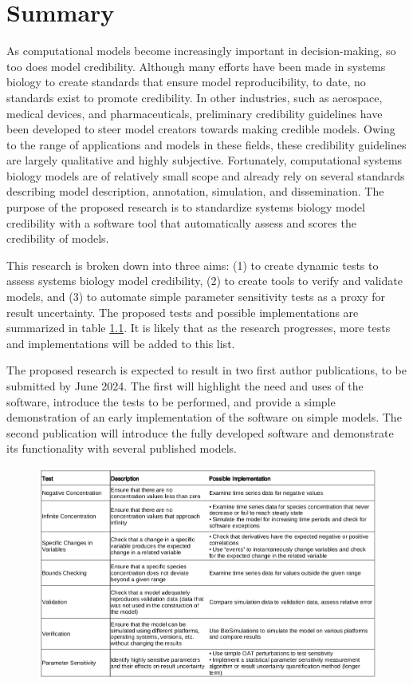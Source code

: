 \documentclass[12pt]{report}
\begin{document}
\chapter{Summary}

As computational models become increasingly important in decision-making, so too does model credibility. Although many efforts have been made in systems biology to create standards that ensure model reproducibility, to date, no standards exist to promote credibility. In other industries, such as aerospace, medical devices, and pharmaceuticals, preliminary credibility guidelines have been developed to steer model creators towards making credible models. Owing to the range of applications and models in these fields, these credibility guidelines are largely qualitative and highly subjective. Fortunately, computational systems biology models are of relatively small scope and already rely on several standards describing model description, annotation, simulation, and dissemination. The purpose of the proposed research is to standardize systems  biology model credibility with a software tool that automatically assess and scores the credibility of models. 

This research is broken down into three aims: (1) to create dynamic tests to assess systems biology model credibility, (2) to create tools to verify and validate models, and (3) to automate simple parameter sensitivity tests as a proxy for result uncertainty. The proposed tests and possible implementations are summarized in table \ref{table:sensitivity}. It is likely that as the research progresses, more tests and implementations will be added to this list. 

The proposed research is expected to result in two first author publications, to be submitted by June 2024. The first will highlight the need and uses of the software, introduce the tests to be performed, and provide a simple demonstration of an early implementation of the software on simple models. The second publication will introduce the fully developed software and demonstrate its functionality with several published models.

\begin{figure}
    \centering
    \includegraphics[width=19cm]{images/testSummary.png}
    \label{table:sensitivity}
\end{figure}





\end{document}
